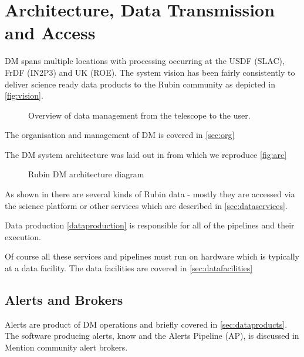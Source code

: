 \section {Architecture, Data Transmission and  Access } \label{sec:arch}
DM spans multiple locations with processing occurring at the USDF (SLAC), FrDF (IN2P3) and UK (ROE).
The system vision has been fairly consistently to deliver science ready data products to the Rubin community as depicted in \autoref{fig:vision}.

\begin{figure*}[ht]
\caption{Overview of data management from the telescope to the user. \label{fig:vision}}
\end{figure*}

The organisation and management of DM is covered in \autoref{sec:org}

The DM system architecture was laid out in \cite{LDM-48} from which we reproduce \autoref{fig:arc}
\begin{figure}
\caption{Rubin DM architecture diagram \citet{LDM-148}\label{fig:arch}}
\end{figure}


As shown in  there are several kinds of Rubin data - mostly they are accessed via
the science platform or other services which are described in \autoref{sec:dataservices}.

Data production \autoref{dataproduction} is responsible for all of the pipelines and their execution.

Of course all these services and pipelines must run on hardware which is typically at a data facility.
The data facilities are covered in \autoref{sec:datafacilities}


\subsection{Alerts and Brokers}
Alerts are  product of DM operations and  briefly covered in \autoref{sec:dataproducts}.
The software producing alerts, know and the Alerts Pipeline (AP), is discussed in 
Mention community alert brokers.
